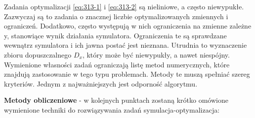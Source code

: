 Zadania optymalizacji \eqref{eq:313-1} i \eqref{eq:313-2} są nieliniowe, a często niewypukłe. Zazwyczaj są to zadania o znacznej liczbie optymalizowanych zmiennych i ograniczeń. Dodatkowo, często występują w nich ograniczenia na zmienne zależne y, stanowiące wynik działania symulatora. Ograniczenia te są sprawdzane wewnątrz symulatora i ich jawna postać jest nieznana. Utrudnia to wyznaczenie zbioru dopuszczalnego $D_x$, który może być niewypukły, a nawet niespójny. Wymienione własności zadań ograniczają listę metod numerycznych, które znajdują zastosowanie w tego typu problemach. Metody te muszą spełniać szereg kryteriów. Jednym z najważniejszych jest odporność algorytmu.

\textbf{Metody obliczeniowe} - w kolejnych punktach
zostaną krótko omówione wymienione techniki do rozwiązywania zadań
symulacja-optymalizacja:
